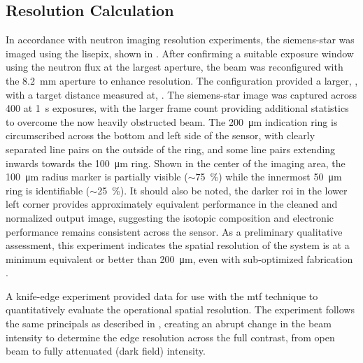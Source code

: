 \documentclass[../../../main.tex]{subfiles}%
\begin{document}
%
    \subsection{Resolution Calculation}%
    \label{sec:chapter-4:semiconductor-timepix:resolution-calculation}%
    In accordance with neutron imaging resolution experiments, the \gls{siemens-star} was imaged using the \gls{lisepix}, shown in .
    After confirming a suitable exposure window using the neutron flux at the largest aperture, the beam was reconfigured with the \SI{8.2}{\milli\meter} aperture to enhance resolution.    
    The configuration provided a larger, , with a target distance measured at, .
    The \gls{siemens-star} image was captured across \SI{400}{\frames} at \SI{1}{\second} exposures, with the larger frame count providing additional statistics to overcome the now heavily obstructed beam.
    The \SI{200}{\micro\meter} indication ring is circumscribed across the bottom and left side of the sensor, with clearly separated line pairs on the outside of the ring, and some line pairs extending inwards towards the \SI{100}{\micro\meter} ring.
    Shown in the center of the imaging area, the \SI{100}{\micro\meter} radius marker is partially visible ($\sim$\SI{75}{\percent}) while the innermost \SI{50}{\micro\meter} ring is identifiable ($\sim$\SI{25}{\percent}).
    It should also be noted, the darker \gls{roi} in the lower left corner provides approximately equivalent performance in the cleaned and normalized output image, suggesting the isotopic composition and electronic performance remains consistent across the sensor.
    As a preliminary qualitative assessment, this experiment indicates the spatial resolution of the system is at a minimum equivalent or better than \SI{200}{\micro\meter}, even with sub-optimized fabrication \cite{Herrera_2018}.
    \par%
    A \gls{knife-edge} experiment provided data for use with the \gls{mtf} technique to quantitatively evaluate the operational spatial resolution.
    The experiment follows the same principals as described in , creating an abrupt change in the beam intensity to determine the edge resolution across the full contrast, from open beam to fully attenuated (dark field) intensity.
\end{document}
